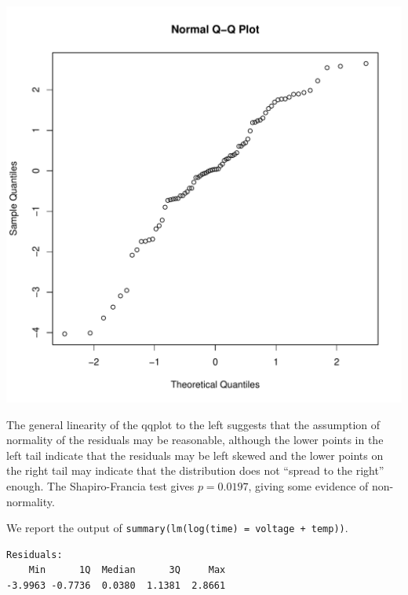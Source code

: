 \documentclass{homework}
\begin{document}
\begin{longproblem}
\begin{minipage}{.35\textwidth}
\includegraphics[width=\textwidth]{qqplot_fluid.pdf}
\end{minipage}
\begin{minipage}{.55\textwidth}
The general linearity of the qqplot to the left suggests that the assumption of normality of the residuals may be reasonable, although the lower points in the left tail indicate that the residuals may be left skewed and the lower points on the right tail may indicate that the distribution does not ``spread to the right'' enough.  The Shapiro-Francia test gives $p = 0.0197$, giving some evidence of non-normality.
\end{minipage}


We report the output of \texttt{summary(lm(log(time) = voltage + temp))}.
\begin{verbatim}
Residuals:
    Min      1Q  Median      3Q     Max 
-3.9963 -0.7736  0.0380  1.1381  2.8661 


\end{verbatim}
\end{longproblem}
\end{document}
